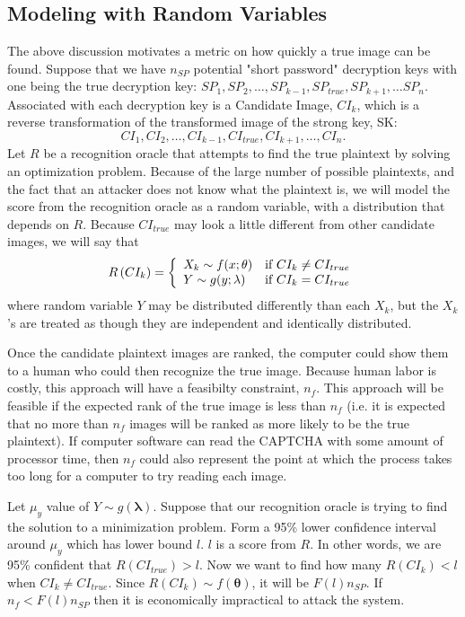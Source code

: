 \documentclass[12pt]{article}
\begin{document}
\subsection*{Modeling with Random Variables}
The above discussion motivates a metric on how quickly a true image can be found. Suppose that we have $n_{SP}$ potential "short password" decryption keys with one being the true decryption key: 
$SP_1, SP_2, \ldots, SP_{k-1}, SP_{true}, SP_{k+1}, \ldots SP_n$.
Associated with each decryption key is a Candidate Image, $CI_k$, which is a reverse transformation of the transformed image of the strong key, SK:
$$CI_1, CI_2, \ldots, CI_{k-1}, CI_{true}, CI_{k+1}, \ldots, CI_n.$$
Let $R$ be a recognition oracle that attempts to find the true plaintext by solving an optimization problem. Because of the large number of possible plaintexts, and the fact that an attacker does not know what the plaintext is, we will model the score from the recognition oracle as a random variable, with a distribution that depends on $R$. Because $CI_{true}$ may look a little different from other candidate images, we will say that
\begin{displaymath}
   R\left(CI_k\right) = \left\{
     \begin{array}{lr}
       X_k \sim f(x; \mathbf{\theta}) & \hbox{if } CI_k \neq CI_{true}\\
       Y \sim g(y; \mathbf{\lambda}) & \hbox{if } CI_k = CI_{true}
     \end{array}
   \right.
\end{displaymath}
where random variable $Y$ may be distributed differently than each $X_k$, but the $X_k$'s are treated as though they are independent and identically distributed.

Once the candidate plaintext images are ranked, the computer could show them to a human who could then recognize the true image. Because human labor is costly, this approach will have a feasibilty constraint, $n_f$. This approach will be feasible if the expected rank of the true image is less than $n_f$ (i.e. it is expected that no more than $n_f$ images will be ranked as more likely to be the true plaintext). If computer software can read the CAPTCHA with some amount of processor time, then $n_f$ could also represent the point at which the process takes too long for a computer to try reading each image.

Let $\mu_y$ value of $Y \sim g(\mathbf{\lambda})$. Suppose that our recognition oracle is trying to find the solution to a minimization problem. Form a 95\% lower confidence interval around $\mu_y$ which has lower bound $l$. $l$ is a score from $R$. In other words, we are 95\% confident that $R(CI_{true}) > l$. Now we want to find how many $R(CI_k) < l$ when $CI_k \neq CI_{true}$. Since $R\left(CI_k\right) \sim f(\mathbf{\theta})$, it will be $F(l) n_{SP}$. If $n_f < F(l) n_{SP}$ then it is economically impractical to attack the system.
\end{document}
